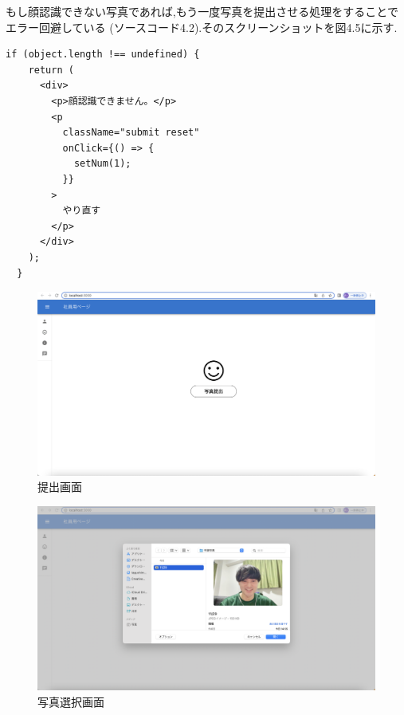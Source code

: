 もし顔認識できない写真であれば,もう一度写真を提出させる処理をすることでエラー回避している
(ソースコード4.2).そのスクリーンショットを図4.5に示す.

\begin{lstlisting}[caption=顔認識エラー処理]
  if (object.length !== undefined) {
    return (
      <div>
        <p>顔認識できません。</p>
        <p
          className="submit reset"
          onClick={() => {
            setNum(1);
          }}
        >
          やり直す
        </p>
      </div>
    );
  }
\end{lstlisting}

\vspace{4mm}

\begin{figure}[!h]
	\begin{center}
			\includegraphics[scale=0.3, clip]{./img/sample1.png}
			\caption{提出画面}
			\label{fig:図の名前}
	\end{center}
\end{figure}

\begin{figure}[!h]
	\begin{center}
			\includegraphics[scale=0.3, clip]{./img/sample2.png}
			\caption{写真選択画面}
			\label{fig:図の名前}
	\end{center}
\end{figure}

